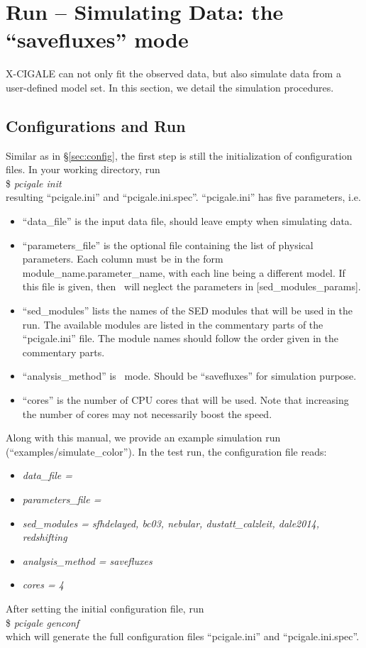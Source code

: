 \section{Run -- Simulating Data: the ``savefluxes'' mode}\label{sec:saveflux}
{\sc X-CIGALE} can not only fit the observed data, but also simulate data from a user-defined model set. 
In this section, we detail the simulation procedures. 

\subsection{Configurations and Run}\label{sec:mod}
Similar as in \S\ref{sec:config}, the first step is still the initialization of configuration files.
In your working directory, run \\
\$ \textit{pcigale init} \\
resulting ``pcigale.ini'' and ``pcigale.ini.spec''.
``pcigale.ini'' has five parameters, i.e.
\begin{itemize}
    \item ``data\_file'' is the input data file, should leave empty when simulating data.  
    \item ``parameters\_file'' is the optional file containing the list of physical parameters.
    Each column must be in the form module\_name.parameter\_name, with each line being a different model.
    If this file is given, then \xcig\ will neglect the parameters in [sed\_modules\_params]. 
    \item ``sed\_modules'' lists the names of the SED modules that will be used in the run. 
    The available modules are listed in the commentary parts of the ``pcigale.ini'' file. 
    The module names should follow the order given in the commentary parts. 
    \item ``analysis\_method'' is \xcig\ mode. Should be ``savefluxes'' for simulation purpose.
    \item ``cores'' is the number of CPU cores that will be used. Note that increasing the number of cores may not necessarily boost the speed. 
\end{itemize}
Along with this manual, we provide an example simulation run (``examples/simulate\_color'').
In the test run, the configuration file reads:
\begin{itemize}
    \item[] \textit{data\_file = }
    \item[] \textit{parameters\_file = }
    \item[] \textit{sed\_modules = sfhdelayed, bc03, nebular, dustatt\_calzleit, dale2014, redshifting}
    \item[] \textit{analysis\_method = savefluxes}
    \item[] \textit{cores = 4}
\end{itemize}
After setting the initial configuration file, run \\
\$ \textit{pcigale genconf} \\
which will generate the full configuration files ``pcigale.ini'' and ``pcigale.ini.spec''. 

